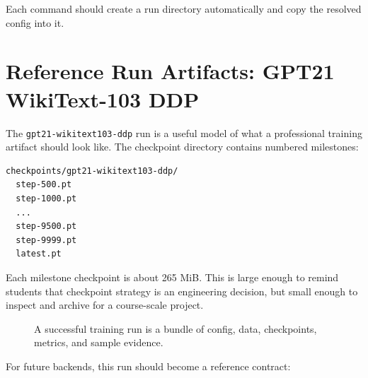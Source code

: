Each command should create a run directory automatically and copy the resolved config into it.

\section{Reference Run Artifacts: GPT21 WikiText-103 DDP}

The \texttt{gpt21-wikitext103-ddp} run is a useful model of what a professional training
artifact should look like. The checkpoint directory contains numbered milestones:

\begin{lstlisting}
checkpoints/gpt21-wikitext103-ddp/
  step-500.pt
  step-1000.pt
  ...
  step-9500.pt
  step-9999.pt
  latest.pt
\end{lstlisting}

Each milestone checkpoint is about 265 MiB. This is large enough to remind students that
checkpoint strategy is an engineering decision, but small enough to inspect and archive
for a course-scale project.

\begin{figure}[htbp]
\centering
{}
\caption{A successful training run is a bundle of config, data, checkpoints, metrics, and sample evidence.}
\end{figure}

For future backends, this run should become a reference contract:

